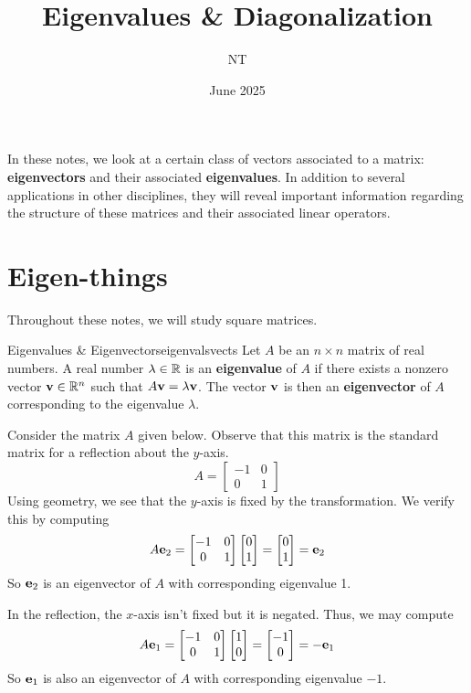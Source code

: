 \documentclass[colorful]{notes}
\title{Eigenvalues \& Diagonalization}
\author{NT}
\date{June 2025}
\begin{document}
    \maketitle
    
    In these notes, we look at a certain class of vectors associated to a matrix: \textbf{eigenvectors} and their associated \textbf{eigenvalues}. In addition to several applications in other disciplines, they will reveal important information regarding the structure of these matrices and their associated linear operators. 

    \section{Eigen-things}
    Throughout these notes, we will study square matrices. 
    \begin{cdefn}{Eigenvalues \& Eigenvectors}{eigenvalsvects}
        Let $A$ be an $n \times n$ matrix of real numbers. A real number $\lambda \in \mathbb{R}$ is an \textbf{eigenvalue} of $A$ if there exists a nonzero vector $\mathbf{v}\in \mathbb{R}^n$ such that $A \mathbf{v} = \lambda \mathbf{v}$. The vector $\mathbf{v}$ is then an \textbf{eigenvector} of $A$ corresponding to the eigenvalue $\lambda$.
    \end{cdefn}

    \begin{example}
        Consider the matrix $A$ given below. Observe that this matrix is the standard matrix for a reflection about the $y$-axis. 
        \begin{equation*}
            A = \begin{bmatrix}
                -1 & 0 \\ 
                0 & 1
            \end{bmatrix}
        \end{equation*}
        Using geometry, we see that the $y$-axis is fixed by the transformation. We verify this by computing 
        \begin{equation*}
            A\mathbf{e}_2 = \begin{bmatrix}
                -1 & 0 \\ 
                0 & 1
            \end{bmatrix} \begin{bmatrix} 0 \\ 1 \end{bmatrix} = \begin{bmatrix} 0 \\ 1 \end{bmatrix} = \mathbf{e}_2 
        \end{equation*}
        So $\mathbf{e}_2$ is an eigenvector of $A$ with corresponding eigenvalue 1. 

        In the reflection, the $x$-axis isn't fixed but it is negated. Thus, we may compute 
        \begin{equation*}
            A\mathbf{e}_1 = \begin{bmatrix}
                -1 & 0 \\ 
                0 & 1
            \end{bmatrix} \begin{bmatrix} 1 \\ 0 \end{bmatrix} = \begin{bmatrix} -1 \\ 0 \end{bmatrix} = -\mathbf{e}_1
        \end{equation*}
        So $\mathbf{e}_1$ is also an eigenvector of $A$ with corresponding eigenvalue $-1$.
    \end{example}
\end{document}
